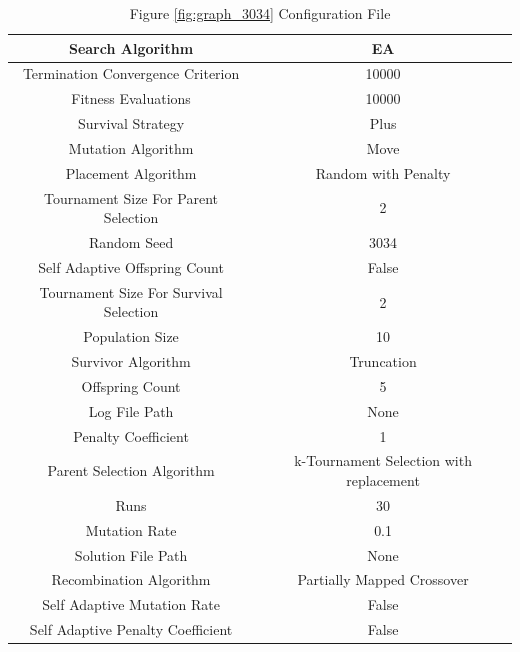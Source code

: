 \documentclass{standalone}
\begin{document}
\begin{table}[!htb]
	\centering
	\caption{Figure \ref{fig:graph_3034} Configuration File}
	\label{tab:graph_3034}
	\begin{tabular}{| c | c |}
		\hline
		Search Algorithm		& EA		 \\
		\hline
		Termination Convergence Criterion		& 10000		 \\
		\hline
		Fitness Evaluations		& 10000		 \\
		\hline
		Survival Strategy		& Plus		 \\
		\hline
		Mutation Algorithm		& Move		 \\
		\hline
		Placement Algorithm		& Random with Penalty		 \\
		\hline
		Tournament Size For Parent Selection		& 2		 \\
		\hline
		Random Seed		& 3034		 \\
		\hline
		Self Adaptive Offspring Count		& False		 \\
		\hline
		Tournament Size For Survival Selection		& 2		 \\
		\hline
		Population Size		& 10		 \\
		\hline
		Survivor Algorithm		& Truncation		 \\
		\hline
		Offspring Count		& 5		 \\
		\hline
		Log File Path		& None		 \\
		\hline
		Penalty Coefficient		& 1		 \\
		\hline
		Parent Selection Algorithm		& k-Tournament Selection with replacement		 \\
		\hline
		Runs		& 30		 \\
		\hline
		Mutation Rate		& 0.1		 \\
		\hline
		Solution File Path		& None		 \\
		\hline
		Recombination Algorithm		& Partially Mapped Crossover		 \\
		\hline
		Self Adaptive Mutation Rate		& False		 \\
		\hline
		Self Adaptive Penalty Coefficient		& False		 \\
		\hline
	\end{tabular}
\end{table}
\end{document}
